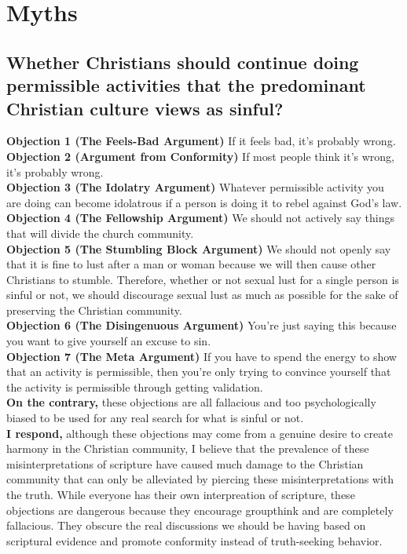 \documentclass[a4paper, parskip=full, 12spt]{article}
\begin{document}
\section{Myths}



\subsection{Whether Christians should continue doing permissible activities that the predominant Christian culture views as sinful?}
\textbf{Objection 1 (The Feels-Bad Argument)} If it feels bad, it's probably wrong. \\
\textbf{Objection 2 (Argument from Conformity)} If most people think it's wrong, it's probably wrong. \\
\textbf{Objection 3 (The Idolatry Argument)} Whatever permissible activity you are doing can become idolatrous if a person is doing it to rebel against God's law.\\
\textbf{Objection 4 (The Fellowship Argument)} We should not actively say things that will divide the church community. \\
\textbf{Objection 5 (The Stumbling Block Argument)} We should not openly say that it is fine to lust after a man or woman because we will then cause other Christians to stumble. Therefore, whether or not sexual lust for a single person is sinful or not, we should discourage sexual lust as much as possible for the sake of preserving the Christian community. \\
\textbf{Objection 6 (The Disingenuous Argument)} You're just saying this because you want to give yourself an excuse to sin. \\
\textbf{Objection 7 (The Meta Argument)} If you have to spend the energy to show that an activity is permissible, then you're only trying to convince yourself that the activity is permissible through getting validation. \\
\textbf{On the contrary,} these objections are all fallacious and too psychologically biased to be used for any real search for what is sinful or not. \\
\textbf{I respond,} although these objections may come from a genuine desire to create harmony in the Christian community, I believe that the prevalence of these misinterpretations of scripture have caused much damage to the Christian community that can only be alleviated by piercing these misinterpretations with the truth. While everyone has their own interpreation of scripture, these objections are dangerous because they encourage groupthink and are completely fallacious. They obscure the real discussions we should be having based on scriptural evidence and promote conformity instead of truth-seeking behavior. \\
\end{document}
